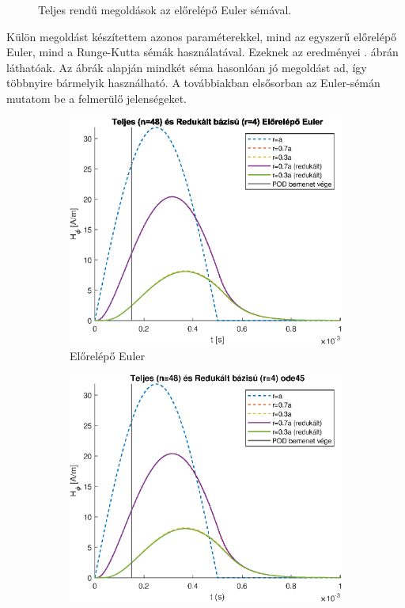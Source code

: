 \begin{figure}[h]
\begin{subfigure}{0.48\textwidth}
            \end{subfigure}
            \caption{Teljes rendű megoldások az előrelépő Euler sémával.}
            \label{fig:vizeses}
        \end{figure}
        \par
        Külön megoldást készítettem azonos paraméterekkel, mind az egyszerű előrelépő Euler, mind a Runge-Kutta sémák használatával. Ezeknek az eredményei . ábrán láthatóak. Az ábrák alapján mindkét séma hasonlóan jó megoldást ad, így többnyire bármelyik használható. A továbbiakban elsősorban az Euler-sémán mutatom be a felmerülő jelenségeket.
        \begin{figure}[h]
            \centering
            \begin{subfigure}{0.48\textwidth}
                \includegraphics[width=\textwidth]{kep/euler_0.15_4_td.eps}
                \caption{Előrelépő Euler}
            \end{subfigure}
            \begin{subfigure}{0.48\textwidth}
                \includegraphics[width=\textwidth]{kep/ode45_0.15_4_td.eps}

\end{subfigure}
\end{figure}
